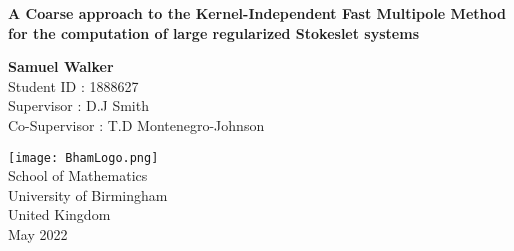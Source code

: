 \begin{titlepage}
    \begin{center}
        \vspace*{1cm}

        \LARGE
        \textbf{A Coarse approach to the Kernel-Independent Fast Multipole Method for the computation of large regularized Stokeslet systems}

        \normalsize
        
        \vspace{1.5cm}
        
        \textbf{Samuel Walker}\\
        Student ID : 1888627 \\
        Supervisor : D.J Smith \\
        Co-Supervisor : T.D Montenegro-Johnson
        
        \vfill
        
        \vspace{0.8cm}
        
        \texttt{[image: BhamLogo.png]}\\
        
        \normalsize
        School of Mathematics\\
        University of Birmingham\\
        United Kingdom\\
        May 2022
            
    \end{center}
\end{titlepage}



